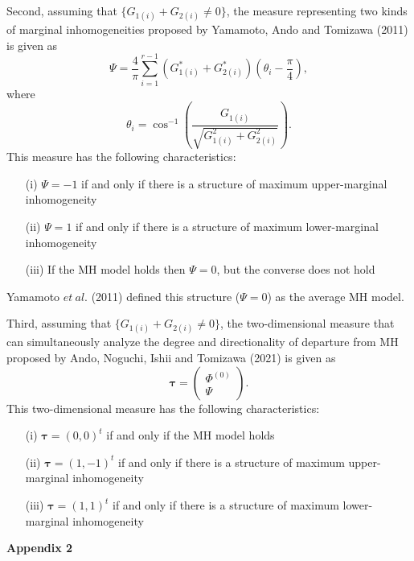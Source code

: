 \documentclass[a4j,12pt]{article}
\begin{document}
Second, assuming that $\{ G_{1(i)} + G_{2(i)} \neq 0 \}$, the measure representing two kinds of marginal inhomogeneities proposed by Yamamoto, Ando and Tomizawa (2011) is given as
\[
\Psi = \frac{4}{\pi} \sum^{r-1}_{i=1} \left( G^{\ast}_{1(i)} + G^{\ast}_{2(i)}\right) \left( \theta_i - \frac{\pi}{4} \right),
\]
where
\[
\theta_i = \cos^{-1} \left( \frac{G_{1(i)}}{\sqrt{ G^2_{1(i)} + G^2_{2(i)} }} \right).
\]
This measure has the following characteristics: 
\begin{enumerate}
\item[(i)] $\Psi = -1$ if and only if there is a structure of maximum upper-marginal inhomogeneity
\item[(ii)] $\Psi = 1$ if and only if there is a structure of maximum lower-marginal inhomogeneity
\item[(iii)] If the MH model holds then $\Psi = 0$, but the converse does not hold
\end{enumerate}
Yamamoto $et~al.$ (2011) defined this structure ($\Psi = 0$) as the average MH model.

Third, assuming that $\{ G_{1(i)} + G_{2(i)} \neq 0 \}$, the two-dimensional measure that can simultaneously analyze the degree and directionality of departure from MH proposed by Ando, Noguchi, Ishii and Tomizawa (2021) is given as
\[
\boldsymbol{\tau} = \begin{pmatrix} \Phi^{(0)} \\ \Psi \end{pmatrix}.
\]
This two-dimensional measure has the following characteristics: 
\begin{enumerate}
\item[(i)] $\boldsymbol{\tau} = (0, 0)^t$ if and only if the MH model holds
\item[(ii)] $\boldsymbol{\tau} = (1, -1)^t$ if and only if there is a structure of maximum upper-marginal inhomogeneity
\item[(iii)] $\boldsymbol{\tau} = (1, 1)^t$ if and only if there is a structure of maximum lower-marginal inhomogeneity
\end{enumerate}


\newpage
\noindent \textbf{\large Appendix 2}
\end{document}

